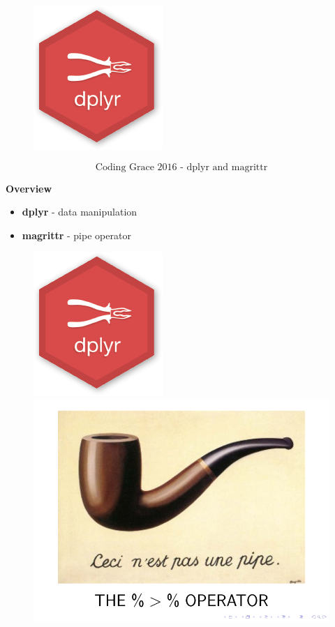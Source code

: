 \documentclass{beamer}
\begin{document}
	
\begin{frame}
\begin{figure}
\centering
\includegraphics[width=0.60\linewidth]{dplyr-hexbin-logo}
\end{figure}
\Large
\[ \mbox{Coding Grace 2016 - dplyr and magrittr}\]
\end{frame}		
	\begin{frame}
		\vspace{-0.5cm}
		\LARGE
		\textbf{Overview}
		
		\begin{itemize}
			\item \textbf{dplyr} - data manipulation


			\item \textbf{magrittr} - pipe operator
		\end{itemize}
			\begin{figure}
				\centering
				\includegraphics[width=0.35\linewidth]{dplyr-hexbin-logo}
				\includegraphics[width=0.35\linewidth]{magrittr}
			\end{figure}	
\end{frame}
\end{document}
